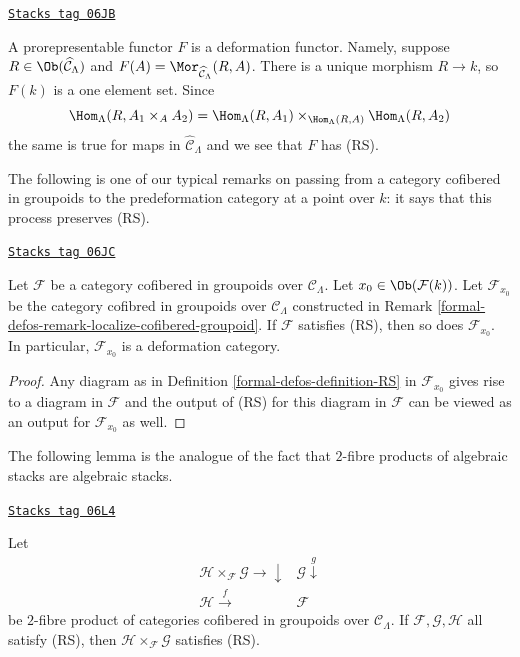 \begin{example}
\label{formal-defos-example-prorepresentable-deformation-functor}
\href{https://stacks.math.columbia.edu/tag/06JB}{\texttt{Stacks tag 06JB}}

A prorepresentable functor $F$ is a deformation functor. Namely, suppose
$R \in \Ob(\widehat{\mathcal{C}}_\Lambda)$ and
$F(A) = \Mor_{\widehat{\mathcal{C}}_\Lambda}(R, A)$.
There is a unique morphism $R \to k$, so $F(k)$ is a one element set.
Since
$$
\Hom_\Lambda(R, A_1 \times_A A_2) =
\Hom_\Lambda(R, A_1) \times_{\Hom_\Lambda(R, A)}
\Hom_\Lambda(R, A_2)
$$
the same is true for maps in $\widehat{\mathcal{C}}_\Lambda$ and
we see that $F$ has (RS).
\end{example}

The following is one of our typical remarks on passing from a category
cofibered in groupoids to the predeformation category at a point over $k$: it
says that this process preserves (RS).

\begin{lemma}[Localize RS]
\label{formal-defos-lemma-localize-RS}
\href{https://stacks.math.columbia.edu/tag/06JC}{\texttt{Stacks tag 06JC}}

Let $\mathcal{F}$ be a category cofibered in groupoids over
$\mathcal{C}_\Lambda$. Let $x_0 \in \Ob(\mathcal{F}(k))$.
Let $\mathcal{F}_{x_0}$ be the category cofibred in groupoids over
$\mathcal{C}_\Lambda$ constructed in
Remark \ref{formal-defos-remark-localize-cofibered-groupoid}.
If $\mathcal{F}$ satisfies (RS), then so does $\mathcal{F}_{x_0}$.
In particular, $\mathcal{F}_{x_0}$ is a deformation category.
\end{lemma}

\begin{proof}
Any diagram as in
Definition \ref{formal-defos-definition-RS}
in $\mathcal{F}_{x_0}$ gives rise to a diagram in $\mathcal{F}$
and the output of (RS) for this diagram in $\mathcal{F}$
can be viewed as an output for $\mathcal{F}_{x_0}$ as well.
\end{proof}

The following lemma is the analogue of the fact that $2$-fibre products
of algebraic stacks are algebraic stacks.

\begin{lemma}
\label{formal-defos-lemma-RS-fiber-product-morphisms}
\href{https://stacks.math.columbia.edu/tag/06L4}{\texttt{Stacks tag 06L4}}

Let
$$
\begin{array}{cc}\mathcal{H} \times_\mathcal{F} \mathcal{G} \longrightarrow\downarrow & \mathcal{G} \overset{g}{\downarrow} \\ \mathcal{H} \overset{f}{\longrightarrow} & \mathcal{F}\end{array}
$$
be $2$-fibre product of categories cofibered in groupoids over
$\mathcal{C}_\Lambda$. If $\mathcal{F}, \mathcal{G}, \mathcal{H}$
all satisfy (RS), then $\mathcal{H} \times_\mathcal{F} \mathcal{G}$
satisfies (RS).
\end{lemma}


